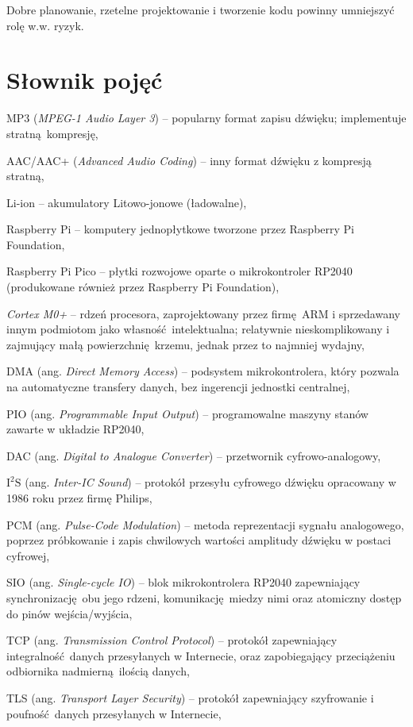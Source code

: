 \documentclass[polish]{aghengthesis}
\let\tempone\itemize
\let\temptwo\enditemize
\renewenvironment{itemize}{\tempone\setlength{\itemsep}{0cm}}{\temptwo}
\newcommand{\isqs}{$\text{I}^{2}\text{S}$}
\begin{document}
		Dobre planowanie, rzetelne projektowanie i tworzenie kodu powinny umniejszyć rolę w.w. ryzyk.
	
	\section{Słownik pojęć}
	\begin{itemize}
		\setlength{\itemsep}{0.3cm}
		\item MP3 (\textit{MPEG-1 Audio Layer 3}) -- popularny format zapisu dźwięku; implementuje stratną kompresję,
		\item AAC/AAC+ (\textit{Advanced Audio Coding}) -- inny format dźwięku z kompresją stratną,
		\item Li-ion -- akumulatory Litowo-jonowe (ładowalne),
		\item Raspberry Pi -- komputery jednopłytkowe tworzone przez Raspberry Pi Foundation,
		\item Raspberry Pi Pico -- płytki rozwojowe oparte o mikrokontroler RP2040 (produkowane również przez Raspberry Pi Foundation),
		\item \textit{Cortex M0+} -- rdzeń procesora, zaprojektowany przez firmę ARM i sprzedawany innym podmiotom jako własność intelektualna; relatywnie nieskomplikowany i zajmujący małą powierzchnię krzemu, jednak przez to najmniej wydajny,
		\item DMA (ang. \textit{Direct Memory Access}) -- podsystem mikrokontrolera, który pozwala na automatyczne transfery danych, bez ingerencji jednostki centralnej,
		\item PIO (ang. \textit{Programmable Input Output}) -- programowalne maszyny stanów zawarte w układzie RP2040,
		\item DAC (ang. \textit{Digital to Analogue Converter}) -- przetwornik cyfrowo-analogowy,
		\item \isqs{} (ang. \textit{Inter-IC Sound}) -- protokół przesyłu cyfrowego dźwięku opracowany w 1986 roku przez firmę Philips,
		\item PCM (ang. \textit{Pulse-Code Modulation}) -- metoda reprezentacji sygnału analogowego, poprzez próbkowanie i zapis chwilowych wartości amplitudy dźwięku w postaci cyfrowej,
		\item SIO (ang. \textit{Single-cycle IO}) -- blok mikrokontrolera RP2040 zapewniający synchronizację obu jego rdzeni, komunikację miedzy nimi oraz atomiczny dostęp do pinów wejścia/wyjścia,
		\item TCP (ang. \textit{Transmission Control Protocol}) -- protokół zapewniający integralność danych przesyłanych w Internecie, oraz zapobiegający przeciążeniu odbiornika nadmierną ilością danych,
		\item TLS (ang. \textit{Transport Layer Security}) -- protokół zapewniający szyfrowanie i poufność danych przesyłanych w Internecie,
	\end{itemize}
\end{document}
